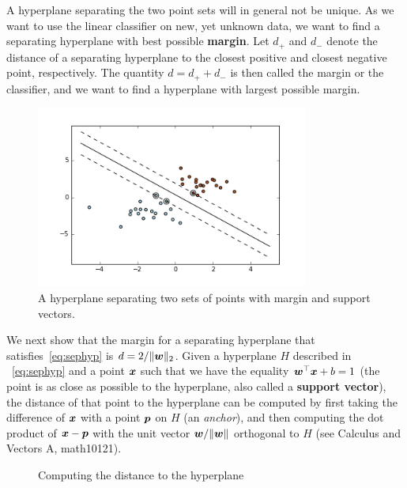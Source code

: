 A hyperplane separating the two point sets will in general not be unique.
As we want to use the linear classifier on new, yet unknown data, we want to find a separating hyperplane with best possible \textbf{margin}. Let $d_+$ and $d_-$ denote the distance of a separating hyperplane to the closest positive and closest negative point, respectively. The quantity $d=d_++d_-$ is then called the margin or the classifier, and we want to find a hyperplane with largest possible margin.

\begin{figure}
\centering
\includegraphics[width=0.8\textwidth]{images/svm-linsep.png}
\caption{A hyperplane separating two sets of points with margin and support vectors.}
\end{figure}

We next show that the margin for a separating hyperplane that satisfies~\eqref{eq:sephyp} is $d=2/\Vert {\bm{w}}\Vert_2$.
Given a hyperplane $H$ described in ~\eqref{eq:sephyp} and a point $\bm{x}$ such that we have the equality $\bm{w}^{\top}\bm{x}+b=1$ (the point is as close as possible to the hyperplane, also called a \textbf{support vector}), the distance of that point to the hyperplane can be computed by first taking the difference of $\bm{x}$ with a point $\bm{p}$ on $H$ (an {\em anchor}), and then computing the dot product of $\bm{x}-\bm{p}$ with the unit vector $\bm{w}/\Vert {\bm{w}}\Vert$ orthogonal to $H$ (see Calculus and Vectors A, math10121).

\begin{figure}
\centering
{}
\caption{Computing the distance to the hyperplane}
\end{figure}

